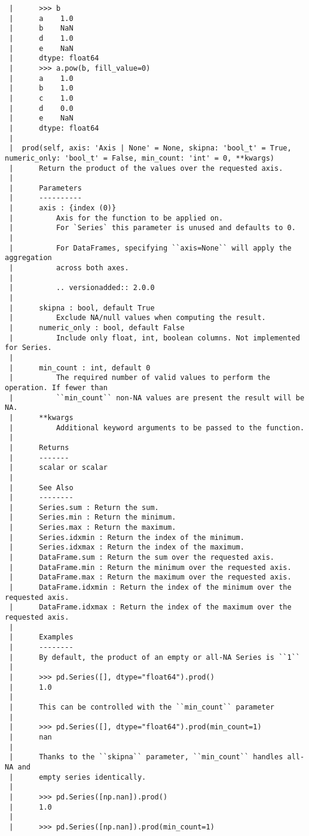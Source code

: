 \documentclass[
  letterpaper,
  DIV=11,
  numbers=noendperiod]{scrreprt}
\begin{document}
\begin{verbatim}
 |      >>> b
 |      a    1.0
 |      b    NaN
 |      d    1.0
 |      e    NaN
 |      dtype: float64
 |      >>> a.pow(b, fill_value=0)
 |      a    1.0
 |      b    1.0
 |      c    1.0
 |      d    0.0
 |      e    NaN
 |      dtype: float64
 |  
 |  prod(self, axis: 'Axis | None' = None, skipna: 'bool_t' = True, numeric_only: 'bool_t' = False, min_count: 'int' = 0, **kwargs)
 |      Return the product of the values over the requested axis.
 |      
 |      Parameters
 |      ----------
 |      axis : {index (0)}
 |          Axis for the function to be applied on.
 |          For `Series` this parameter is unused and defaults to 0.
 |      
 |          For DataFrames, specifying ``axis=None`` will apply the aggregation
 |          across both axes.
 |      
 |          .. versionadded:: 2.0.0
 |      
 |      skipna : bool, default True
 |          Exclude NA/null values when computing the result.
 |      numeric_only : bool, default False
 |          Include only float, int, boolean columns. Not implemented for Series.
 |      
 |      min_count : int, default 0
 |          The required number of valid values to perform the operation. If fewer than
 |          ``min_count`` non-NA values are present the result will be NA.
 |      **kwargs
 |          Additional keyword arguments to be passed to the function.
 |      
 |      Returns
 |      -------
 |      scalar or scalar
 |      
 |      See Also
 |      --------
 |      Series.sum : Return the sum.
 |      Series.min : Return the minimum.
 |      Series.max : Return the maximum.
 |      Series.idxmin : Return the index of the minimum.
 |      Series.idxmax : Return the index of the maximum.
 |      DataFrame.sum : Return the sum over the requested axis.
 |      DataFrame.min : Return the minimum over the requested axis.
 |      DataFrame.max : Return the maximum over the requested axis.
 |      DataFrame.idxmin : Return the index of the minimum over the requested axis.
 |      DataFrame.idxmax : Return the index of the maximum over the requested axis.
 |      
 |      Examples
 |      --------
 |      By default, the product of an empty or all-NA Series is ``1``
 |      
 |      >>> pd.Series([], dtype="float64").prod()
 |      1.0
 |      
 |      This can be controlled with the ``min_count`` parameter
 |      
 |      >>> pd.Series([], dtype="float64").prod(min_count=1)
 |      nan
 |      
 |      Thanks to the ``skipna`` parameter, ``min_count`` handles all-NA and
 |      empty series identically.
 |      
 |      >>> pd.Series([np.nan]).prod()
 |      1.0
 |      
 |      >>> pd.Series([np.nan]).prod(min_count=1)

\end{verbatim}
\end{document}
